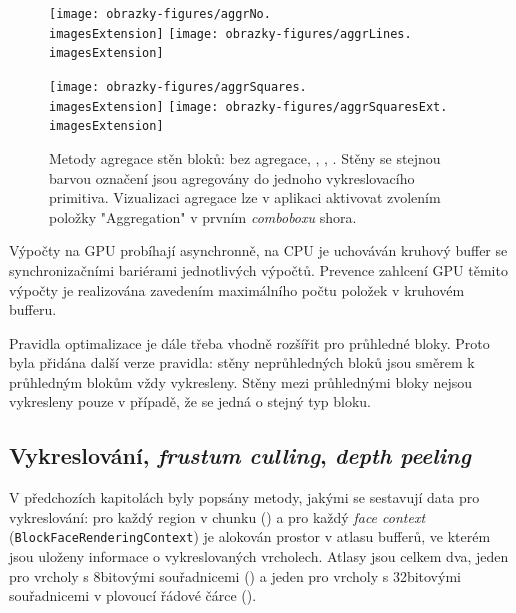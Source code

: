 \begin{figure}[H]
	\centering
	\texttt{[image: obrazky-figures/aggrNo.\\imagesExtension]}
	\hfill
	\texttt{[image: obrazky-figures/aggrLines.\\imagesExtension]}

	\vspace{2.5mm}

	\texttt{[image: obrazky-figures/aggrSquares.\\imagesExtension]}
	\hfill
	\texttt{[image: obrazky-figures/aggrSquaresExt.\\imagesExtension]}
	\caption{Metody agregace stěn bloků: bez agregace, , , . Stěny se stejnou barvou označení jsou agregovány do jednoho vykreslovacího primitiva. Vizualizaci agregace lze v aplikaci aktivovat zvolením položky "Aggregation" v prvním \textit{comboboxu} shora.}
\end{figure}

Výpočty na GPU probíhají asynchronně, na CPU je uchováván kruhový buffer se synchronizačními bariérami jednotlivých výpočtů. Prevence zahlcení GPU těmito výpočty je realizována zavedením maximálního počtu položek v kruhovém bufferu.

Pravidla optimalizace je dále třeba vhodně rozšířit pro průhledné bloky. Proto byla přidána další verze pravidla: stěny neprůhledných bloků jsou směrem k průhledným blokům vždy vykresleny. Stěny mezi průhlednými bloky nejsou vykresleny pouze v případě, že se jedná o stejný typ bloku.

\subsection{Vykreslování, \textit{frustum culling}, \textit{depth peeling}}
V předchozích kapitolách byly popsány metody, jakými se sestavují data pro vykreslování: pro každý region v chunku () a pro každý \textit{face context} (\texttt{BlockFace\-Rendering\-Context}) je alokován prostor v atlasu bufferů, ve kterém jsou uloženy informace o vykreslovaných vrcholech. Atlasy jsou celkem dva, jeden pro vrcholy s 8bitovými souřadnicemi () a jeden pro vrcholy s 32bitovými souřadnicemi v plovoucí řádové čárce ().

